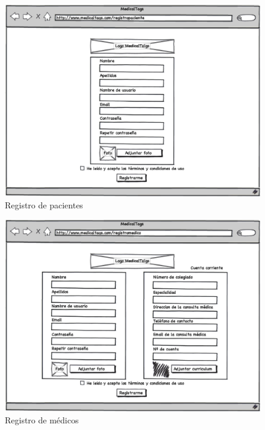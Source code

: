 			\begin{figure}[H]
			  \centering
			    \includegraphics[width=12cm]{img/eps/3_Registro_Paciente.eps}
			  \caption{Registro de pacientes}
			  \label{fig:registro_paciente}
			\end{figure}
			
			\begin{figure}[H]
			  \centering
			    \includegraphics[width=12cm]{img/eps/2_Registro_Medico.eps}
			  \caption{Registro de médicos}
			  \label{fig:registro_medico}
			\end{figure}
			
